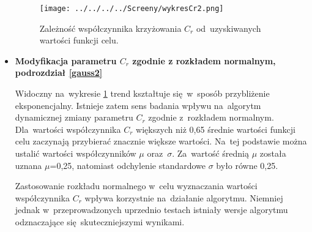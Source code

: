\begin{itemize}
\begin{figure}[h!]
\begin{center}
		\texttt{[image: ../../../../Screeny/wykresCr2.png]}
		\caption{Zależność współczynnika krzyżowania $C_{r}$ od~uzyskiwanych wartości funkcji celu.}
		\label{wykresCr}	
\end{center}		
\end{figure}

\item \textbf{Modyfikacja parametru $C_{r}$ zgodnie z rozkładem normalnym, podrozdział \ref{gauss2}}

Widoczny na~wykresie \ref{wykresCr} trend kształtuje się~w~sposób przybliżenie eksponencjalny. Istnieje zatem sens badania wpływu na~algorytm dynamicznej zmiany parametru $C_{r}$ zgodnie z~rozkładem normalnym. Dla~wartości współczynnika $C_{r}$ większych niż 0,65 średnie wartości funkcji celu zaczynają przybierać znacznie większe wartości. Na~tej podstawie można ustalić wartości współczynników $\mu$ oraz~$\sigma$. Za~wartość średnią $\mu$ została uznana $\mu$=0,25, natomiast odchylenie standardowe $\sigma$ było równe 0,25.

\begin{table}[h!]
\begin{center}
\caption{Wartości średniego błędu względnego funkcji celu dla metody krzyżowania dwumianowego ze zmiennym parametrem $C_{r}$ zgodnie z rozkładem normalnym.}
\label{parametrFgauss}
\end{center}
\end{table}

Zastosowanie rozkładu normalnego w~celu wyznaczania wartości współczynnika $C_{r}$ wpływa korzystnie na~działanie algorytmu. Niemniej jednak w~przeprowadzonych uprzednio testach istniały wersje algorytmu odznaczające się~skuteczniejszymi wynikami.
\end{itemize}
 
